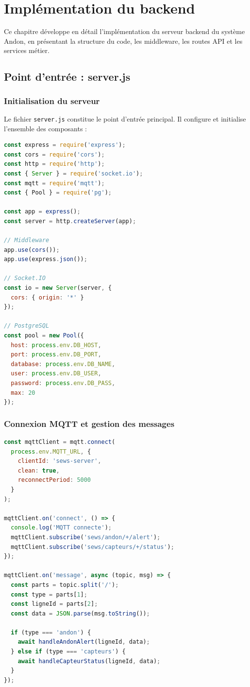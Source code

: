 \chapter{Impl\'ementation du backend}

Ce chapitre d\'eveloppe en d\'etail l'impl\'ementation du serveur backend du syst\`eme Andon, en pr\'esentant la structure du code, les middleware, les routes API et les services m\'etier.

\section{Point d'entr\'ee : server.js}

\subsection{Initialisation du serveur}

Le fichier \texttt{server.js} constitue le point d'entr\'ee principal. Il configure et initialise l'ensemble des composants :

\begin{lstlisting}[language=JavaScript,caption={Initialisation du serveur Express},label={lst:init_express}]
const express = require('express');
const cors = require('cors');
const http = require('http');
const { Server } = require('socket.io');
const mqtt = require('mqtt');
const { Pool } = require('pg');

const app = express();
const server = http.createServer(app);

// Middleware
app.use(cors());
app.use(express.json());

// Socket.IO
const io = new Server(server, {
  cors: { origin: '*' }
});

// PostgreSQL
const pool = new Pool({
  host: process.env.DB_HOST,
  port: process.env.DB_PORT,
  database: process.env.DB_NAME,
  user: process.env.DB_USER,
  password: process.env.DB_PASS,
  max: 20
});
\end{lstlisting}

\subsection{Connexion MQTT et gestion des messages}

\begin{lstlisting}[language=JavaScript,caption={Gestion des messages MQTT},label={lst:mqtt_handler}]
const mqttClient = mqtt.connect(
  process.env.MQTT_URL, {
    clientId: 'sews-server',
    clean: true,
    reconnectPeriod: 5000
  }
);

mqttClient.on('connect', () => {
  console.log('MQTT connecte');
  mqttClient.subscribe('sews/andon/+/alert');
  mqttClient.subscribe('sews/capteurs/+/status');
});

mqttClient.on('message', async (topic, msg) => {
  const parts = topic.split('/');
  const type = parts[1];
  const ligneId = parts[2];
  const data = JSON.parse(msg.toString());

  if (type === 'andon') {
    await handleAndonAlert(ligneId, data);
  } else if (type === 'capteurs') {
    await handleCapteurStatus(ligneId, data);
  }
});
\end{lstlisting}

